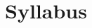 \documentclass{mybook}
\theoremstyle{definition}
\theoremstyle{remark}
\begin{document}
\frontmatter
\chapter*{Syllabus}

\tableofcontents
\mainmatter
%

\end{document}
